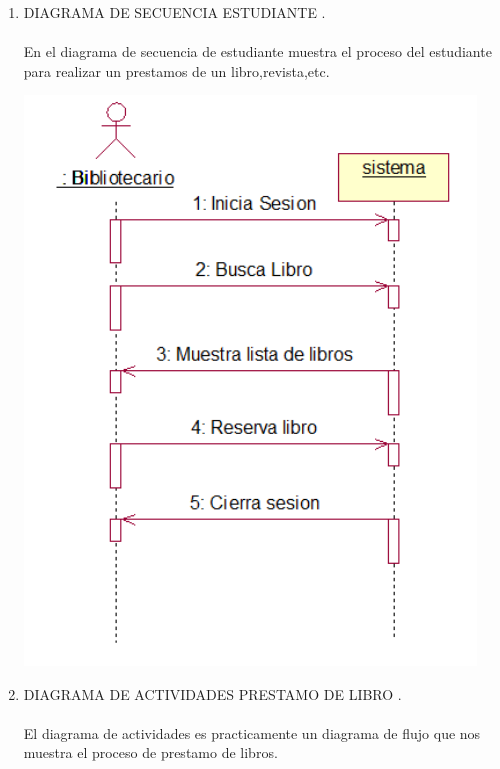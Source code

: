 \begin{enumerate}[1.]
\newpage
	\item DIAGRAMA DE SECUENCIA ESTUDIANTE .\\\\
	En el diagrama de secuencia de estudiante muestra el proceso del estudiante  para realizar un prestamos de un libro,revista,etc.\\
	\begin{center}
	\includegraphics[width=12cm]{./Imagenes/img5} 
	\end{center}
	\newpage
\item DIAGRAMA DE ACTIVIDADES PRESTAMO DE LIBRO .\\\\
    El diagrama de actividades es practicamente un diagrama de flujo que nos muestra el proceso de prestamo de libros.
	
\end{enumerate} 
